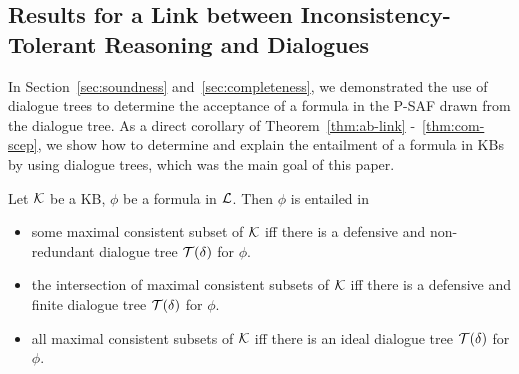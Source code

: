 \subsection{Results for a Link between Inconsistency-Tolerant Reasoning and Dialogues}

In Section~\ref{sec:soundness} and~\ref{sec:completeness}, we demonstrated the use of dialogue trees to determine the acceptance of a formula in the P-SAF drawn from the dialogue tree. As a direct corollary of Theorem~\ref{thm:ab-link} -\ \ref{thm:com-scep}, we show how to determine and explain the entailment of a formula in KBs by using dialogue trees, which was the main goal of this paper.

\begin{corollary}
    Let $ \mathcal{K}$ be a KB, $\phi$ be a formula in $\mathcal{L}$. Then $\phi$ is entailed in
    \begin{itemize}
        \item some maximal consistent subset of $\mathcal{K}$ iff there is a defensive and non-redundant dialogue tree $\mathcal{T}(\delta)$ for $\phi$.
        
        \item the intersection of maximal consistent subsets of $\mathcal{K}$ iff there is a defensive and finite dialogue tree $\mathcal{T}(\delta)$ for $\phi$.
        
        \item all maximal consistent subsets of $\mathcal{K}$ iff there is an ideal dialogue tree $\mathcal{T}(\delta)$ for $\phi$.
    \end{itemize}   
\end{corollary}

